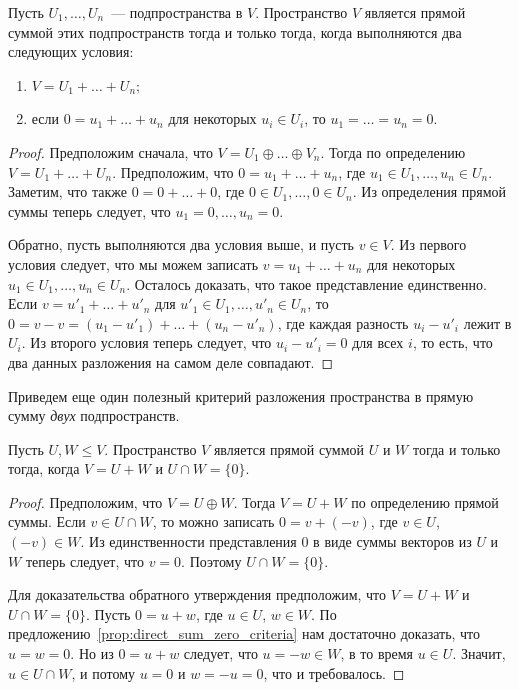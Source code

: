 \begin{proposition}\label{prop:direct_sum_zero_criteria}
Пусть $U_1,\dots,U_n$~--- подпространства в $V$.
Пространство $V$ является прямой суммой этих подпространств тогда
и только тогда, когда выполняются два следующих условия:
\begin{enumerate}
\item $V = U_1 + \dots + U_n$;
\item если $0 = u_1 + \dots + u_n$ для некоторых $u_i\in U_i$, то
$u_1 = \dots = u_n = 0$.
\end{enumerate}
\end{proposition}
\begin{proof}
Предположим сначала, что $V = U_1\oplus\dots\oplus V_n$.
Тогда по определению $V = U_1 + \dots + U_n$.
Предположим, что $0 = u_1 + \dots + u_n$, где $u_1\in U_1,\dots,u_n\in U_n$.
Заметим, что также $0 = 0 + \dots + 0$, где $0\in U_1,\dots,0\in U_n$.
Из определения прямой суммы теперь следует, что 
$u_1 = 0,\dots,u_n=0$.

Обратно, пусть выполняются два условия выше, и пусть $v\in V$.
Из первого условия следует, что мы можем записать
$v = u_1 + \dots + u_n$ для некоторых $u_1\in U_1,\dots,u_n\in U_n$.
Осталось доказать, что такое представление единственно.
Если $v = u'_1 + \dots + u'_n$ для $u'_1\in U_1,\dots,u'_n\in U_n$,
то $0 = v - v = (u_1 - u'_1) + \dots + (u_n - u'_n)$, где каждая
разность $u_i - u'_i$ лежит в $U_i$. Из второго условия теперь
следует, что $u_i - u'_i = 0$ для всех $i$, то есть,
что два данных разложения на самом деле совпадают.
\end{proof}

Приведем еще один полезный критерий разложения пространства
в прямую сумму {\em двух} подпространств.

\begin{proposition}\label{prop:direct-sum-criteria-for-2}
Пусть $U,W\leq V$. Пространство $V$ является прямой суммой $U$ и $W$
тогда и только тогда, когда $V = U+W$ и $U\cap W = \{0\}$.
\end{proposition}
\begin{proof}
Предположим, что $V = U\oplus W$. Тогда $V = U + W$ по определению
прямой суммы. Если $v\in U\cap W$, то можно записать
$0 = v + (-v)$, где $v\in U$, $(-v)\in W$. Из единственности представления
$0$ в виде суммы векторов из $U$ и $W$ теперь следует, что $v=0$.
Поэтому $U\cap W = \{0\}$.

Для доказательства обратного утверждения предположим, что $V = U+W$
и $U\cap W = \{0\}$. Пусть $0 = u+w$, где $u\in U$, $w\in W$.
По предложению~\ref{prop:direct_sum_zero_criteria}
нам достаточно доказать, что $u=w=0$. Но из $0=u+w$ следует,
что $u = -w\in W$, в то время $u\in U$. Значит,
$u\in U\cap W$, и потому $u=0$ и $w = -u = 0$, что и требовалось.
\end{proof}


